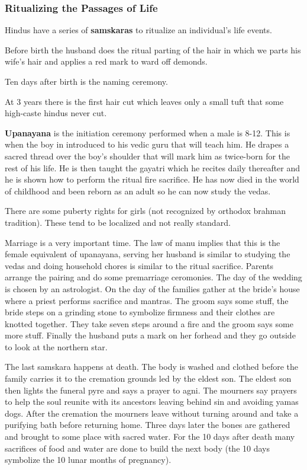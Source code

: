 \documentclass{article}
\begin{document}
\subsubsection{Ritualizing the Passages of Life}
\label{ssub:ritualizing_the_passages_of_life}
Hindus have a series of \textbf{samskaras} to ritualize an individual's life events.

Before birth the husband does the ritual parting of the hair in which we parts his wife's hair and applies a red mark to ward off demonds.

Ten days after birth is the naming ceremony.

At 3 years there is the first hair cut which leaves only a small tuft that some high-caste hindus never cut.

\textbf{Upanayana} is the initiation ceremony performed when a male is 8-12. This is when the boy in introduced to his vedic guru that will teach him. He drapes a sacred thread over the boy's shoulder that will mark him as twice-born for the rest of his life. He is then taught the gayatri which he recites daily thereafter and he is shown how to perform the ritual fire sacrifice. He has now died in the world of childhood and been reborn as an adult so he can now study the vedas.

There are some puberty rights for girls (not recognized by orthodox brahman tradition). These tend to be localized and not really standard.

Marriage is a very important time. The law of manu implies that this is the female equivalent of upanayana, serving her husband is similar to studying the vedas and doing household chores is similar to the ritual sacrifice. Parents arrange the pairing and do some premarriage ceromonies. The day of the wedding is chosen by an astrologist. On the day of the families gather at the bride's house where a priest performs sacrifice and mantras. The groom says some stuff, the bride steps on a grinding stone to symbolize firmness and their clothes are knotted together. They take seven steps around a fire and the groom says some more stuff. Finally the husband puts a mark on her forhead and they go outside to look at the northern star.

The last samskara happens at death. The body is washed and clothed before the family carries it to the cremation grounds led by the eldest son. The eldest son then lights the funeral pyre and says a prayer to agni. The mourners say prayers to help the soul reunite with its ancestors leaving behind sin and avoiding yamas dogs. After the cremation the mourners leave without turning around and take a purifying bath before returning home.  Three days later the bones are gathered and brought to some place with sacred water. For the 10 days after death many sacrifices of food and water are done to build the next body (the 10 days symbolize the 10 lunar months of pregnancy).
\end{document}
